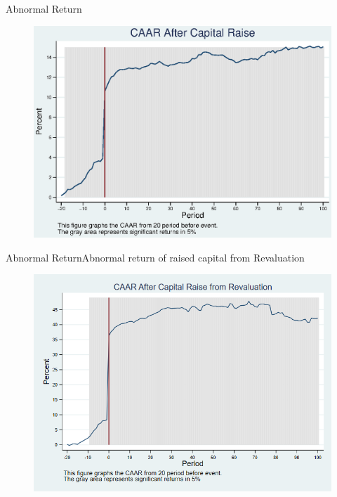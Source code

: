 \documentclass{beamer}
\begin{document}
\begin{frame}{Abnormal Return}
\label{abreturnWithoutAlpha}
\begin{figure}
\centering
\includegraphics[width=0.7\linewidth]{AbReturn_WithoutAlpha.eps}
\label{fig:abreturn3}
\end{figure}
\hfill\hyperlink{abreturn}{}
\end{frame}

\begin{frame}{Abnormal Return}{Abnormal return of raised capital from Revaluation}
\label{abreturnrevalutionWithoutAlpha}
\begin{figure}
\centering
\includegraphics[width=0.65\linewidth]{AbReturnRevalution_WithoutAlpha}
\label{fig:abreturnrevalution3}
\end{figure}

\hfill\hyperlink{abreturnrevalution}{}
\end{frame}
\end{document}
